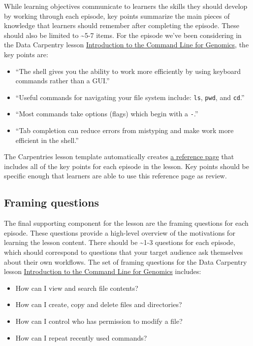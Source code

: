 \documentclass[]{book}
\providecommand{\tightlist}{%
  \setlength{\itemsep}{0pt}\setlength{\parskip}{0pt}}
\begin{document}
While learning objectives communicate to learners the skills they should develop by working through each episode,
key points summarize the main pieces of knowledge that learners should remember after completing
the episode. These should also be limited to \textasciitilde{}5-7 items. For the episode we've been considering in the Data Carpentry lesson \href{https://datacarpentry.org/shell-genomics/}{Introduction to the Command Line for Genomics}, the
key points are:

\begin{itemize}
\tightlist
\item
  ``The shell gives you the ability to work more efficiently by using keyboard commands rather than a GUI.''
\item
  ``Useful commands for navigating your file system include: \texttt{ls}, \texttt{pwd}, and \texttt{cd}.''
\item
  ``Most commands take options (flags) which begin with a \texttt{-}.''
\item
  ``Tab completion can reduce errors from mistyping and make work more efficient in the shell.''
\end{itemize}

The Carpentries lesson template automatically creates \href{https://datacarpentry.org/shell-genomics/reference/}{a reference page} that includes all of the key points for
each episode in the lesson. Key points should be specific enough that learners are able to use this reference
page as review.

\hypertarget{framing-questions}{%
\subsection{Framing questions}\label{framing-questions}}

The final supporting component for the lesson are the framing questions for each episode. These questions
provide a high-level overview of the motivations for learning the lesson content. There should be \textasciitilde{}1-3
questions for each episode, which should correspond to questions that your target audience ask themselves
about their own workflows. The set of framing questions for the Data Carpentry lesson \href{https://datacarpentry.org/shell-genomics/}{Introduction to the Command Line for Genomics} includes:

\begin{itemize}
\tightlist
\item
  How can I view and search file contents?
\item
  How can I create, copy and delete files and directories?
\item
  How can I control who has permission to modify a file?
\item
  How can I repeat recently used commands?
\end{itemize}
\end{document}
